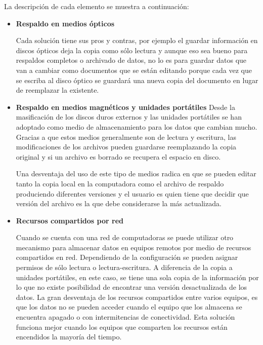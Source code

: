 La descripci\'{o}n de cada elemento se muestra a continuaci\'{o}n:

    \begin{itemize}
    
      \item \textbf{Respaldo en medios \'{opticos}}


Cada soluci\'{o}n tiene sus pros y contras, por ejemplo el guardar informaci\'{o}n en discos \'{o}pticos deja la copia como s\'{o}lo lectura y aunque eso sea bueno para respaldos completos o archivado de datos, no lo es para guardar datos que van a cambiar como documentos que se est\'{a}n editando porque cada vez que se escriba al disco \'{o}ptico se guardar\'{a} una nueva copia del documento en lugar de reemplazar la existente.

      \item \textbf{Respaldo en medios magn\'{e}ticos y unidades port\'{a}tiles}
Desde la masificaci\'{o}n de los discos duros externos y las unidades port\'{a}tiles se han adoptado como medio de almacenamiento para los datos que cambian mucho. Gracias a que estos medios generalmente son de lectura y escritura, las modificaciones de los archivos pueden guardarse reemplazando la copia original y si un archivo es borrado se recupera el espacio en disco.

Una desventaja del uso de este tipo de medios radica en que se pueden editar tanto la copia local en la computadora como el archivo de respaldo produciendo diferentes versiones y el usuario es quien tiene que decidir que versi\'{o}n del archivo es la que debe considerarse la m\'{a}s actualizada.

      \item \textbf{Recursos compartidos por red}

Cuando se cuenta con una red de computadoras se puede utilizar otro mecanismo para almacenar datos en equipos remotos por medio de recursos compartidos en red. Dependiendo de la configuraci\'{o}n se pueden asignar permisos de s\'{o}lo lectura o lectura-escritura. A diferencia de la copia a unidades port\'{a}tiles, en este caso, se tiene una sola copia de la informaci\'{o}n por lo que no existe posibilidad de encontrar una versi\'{o}n desactualizada de los datos. La gran desventaja de los recursos compartidos entre varios equipos, es que los datos no se pueden acceder cuando el equipo que los almacena se encuentra apagado o con intermitencias de conectividad. Esta soluci\'{o}n funciona mejor cuando los equipos que comparten los recursos est\'{a}n encendidos la mayor\'{i}a del tiempo.


\end{itemize}
